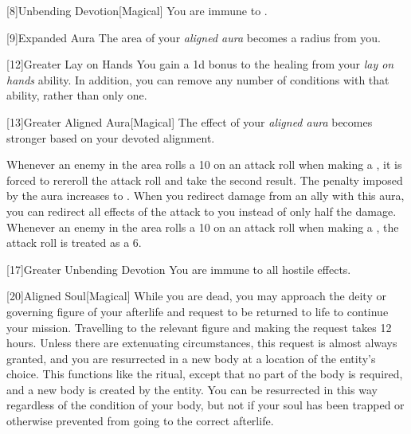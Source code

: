             [8]{Unbending Devotion}[Magical]
            You are immune to  .

            [9]{Expanded Aura}
            The area of your \textit{aligned aura} becomes a \arealarge radius  from you.

            [12]{Greater Lay on Hands} 
            You gain a \plus1d bonus to the healing from your \textit{lay on hands} ability.
            In addition, you can remove any number of conditions with that ability, rather than only one.

            [13]{Greater Aligned Aura}[Magical]
            The effect of your \textit{aligned aura} becomes stronger based on your devoted alignment.

             Whenever an enemy in the area rolls a 10 on an attack roll when making a , it is forced to rereroll the attack roll and take the second result.
             The penalty imposed by the aura increases to .
             When you redirect damage from an ally with this aura, you can redirect all effects of the attack to you instead of only half the damage.
             Whenever an enemy in the area rolls a 10 on an attack roll when making a , the attack roll is treated as a 6.

            [17]{Greater Unbending Devotion}
            You are immune to all hostile  effects.

            [20]{Aligned Soul}[Magical]
            While you are dead, you may approach the deity or governing figure of your afterlife and request to be returned to life to continue your mission.
            Travelling to the relevant figure and making the request takes 12 hours.
            Unless there are extenuating circumstances, this request is almost always granted, and you are resurrected in a new body at a location of the entity's choice.
            This functions like the  ritual, except that no part of the body is required, and a new body is created by the entity.
            You can be resurrected in this way regardless of the condition of your body, but not if your soul has been trapped or otherwise prevented from going to the correct afterlife.

